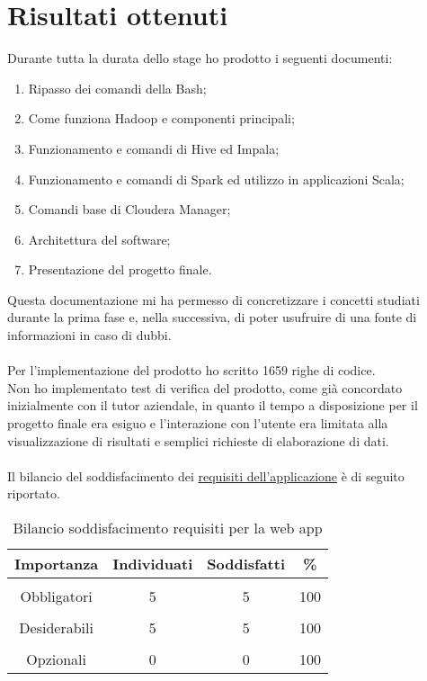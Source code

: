\section{Risultati ottenuti}
Durante tutta la durata dello stage ho prodotto i seguenti documenti:
\begin{enumerate}
	\item Ripasso dei comandi della \gls{Bash};
	\item Come funziona Hadoop e componenti principali;
	\item Funzionamento e comandi di Hive ed Impala;
	\item Funzionamento e comandi di Spark ed utilizzo in applicazioni Scala;
	\item Comandi base di Cloudera Manager;
	\item Architettura del software;
	\item Presentazione del progetto finale.
\end{enumerate}
Questa documentazione mi ha permesso di concretizzare i concetti studiati durante la prima fase e, nella successiva, di poter usufruire di una fonte di informazioni in caso di dubbi.\\\\
Per l'implementazione del prodotto ho scritto 1659 righe di codice.\\
Non ho implementato test di verifica del prodotto, come già concordato inizialmente con il tutor aziendale, in quanto il tempo a disposizione per il progetto finale era esiguo e l'interazione con l'utente era limitata alla visualizzazione di risultati e semplici richieste di elaborazione di dati.\\\\
Il bilancio del soddisfacimento dei \hyperref[req-web-app]{requisiti dell'applicazione} è di seguito riportato.\\

\begin{table}[!h] %
	\caption{Bilancio soddisfacimento requisiti per la web app}
	\label{tab:bilancio-app}
	\centering
	\begin{tabular}{ c | c | c | c}
		\textbf{Importanza} & \textbf{Individuati} & \textbf{Soddisfatti} & \textbf{\%}\\
		\hline
		\hline
		\\[-2.5mm]
		Obbligatori & 5 & 5 & 100 \\
		\hline
		\\[-2.5mm]
		Desiderabili & 5 & 5 & 100 \\
		\hline
		\\[-2.5mm]
		Opzionali & 0 & 0 & 100 \\
		\hline
	\end{tabular}
\end{table}%